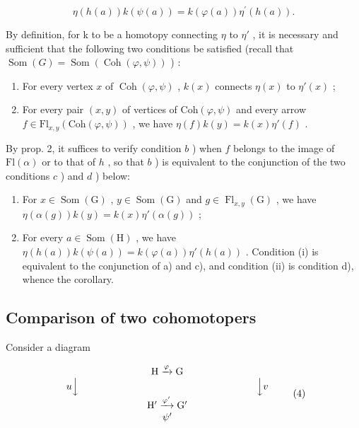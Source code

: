 \[
\eta (h (a)) k (\psi (a)) = k (\varphi (a)) \eta^ {\prime} (h (a)).
\]

By definition, for k to be a homotopy connecting \(\eta\) to \(\eta'\) , it is necessary and sufficient that the following two conditions be satisfied (recall that \(\operatorname{Som}(G) = \operatorname{Som}(\operatorname{Coh}(\varphi, \psi))\) ) :

\begin{enumerate}
\def\labelenumi{\alph{enumi})}
\item
  For every vertex \(x\) of \(\operatorname{Coh}(\varphi, \psi)\) , \(k(x)\) connects \(\eta(x)\) to \(\eta'(x)\) ;
\item
  For every pair \((x,y)\) of vertices of \(\mathrm{Coh}(\varphi,\psi)\) and every arrow \(f\in\mathrm{Fl}_{x,y}(\mathrm{Coh}(\varphi,\psi))\) , we have \(\eta(f)k(y)=k(x)\eta'(f)\) .
\end{enumerate}

By prop. 2, it suffices to verify condition \(b\) ) when \(f\) belongs to the image of \(\mathrm{Fl}(\alpha)\) or to that of \(h\) , so that \(b\) ) is equivalent to the conjunction of the two conditions \(c\) ) and \(d\) ) below:

\begin{enumerate}
\def\labelenumi{\alph{enumi})}
\setcounter{enumi}{2}
\item
  For \(x \in \operatorname{Som}(\mathrm{G})\) , \(y \in \operatorname{Som}(\mathrm{G})\) and \(g \in \operatorname{Fl}_{x,y}(\mathrm{G})\) , we have \(\eta(\alpha(g))k(y) = k(x)\eta'(\alpha(g))\) ;
\item
  For every \(a \in \operatorname{Som}(\mathrm{H})\) , we have \(\eta(h(a))k(\psi(a)) = k(\varphi(a))\eta'(h(a))\) . Condition (i) is equivalent to the conjunction of a) and c), and condition (ii) is condition d), whence the corollary.
\end{enumerate}

\subsection{Comparison of two cohomotopers}

Consider a diagram

\[
\begin{array}{c} \mathrm{H} \xrightarrow {\varphi} \mathrm{G} \\ u \Big \downarrow \qquad \qquad \qquad \qquad \qquad \qquad \qquad \qquad \qquad \Big \downarrow v \\ \mathrm{H} ^ {\prime} \xrightarrow {\varphi^ {\prime}} \mathrm{G} ^ {\prime} \\ \psi^ {\prime} \end{array}\tag{4}
\]

